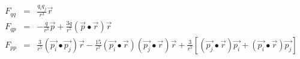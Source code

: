 \documentclass[12pt]{article}
\begin{document}
\begin{eqnarray*}
F_{qq} & = & \frac{q_i q_j}{r^3} \vec{r} \\
F_{qp} & = & -\frac{q}{r^3} \vec{p} + \frac{3q}{r^5} 
             (\vec{p} \bullet \vec{r}) \vec{r} \\
F_{pp} & = & \frac{3}{r^5} (\vec{p_i} \bullet \vec{p_j}) \vec{r} -
             \frac{15}{r^7} (\vec{p_i} \bullet \vec{r}) 
	     (\vec{p_j} \bullet \vec{r}) \vec{r} + 
             \frac{3}{r^5} \left[ (\vec{p_j} \bullet \vec{r}) \vec{p_i} + 
             (\vec{p_i} \bullet \vec{r}) \vec{p_j} \right]
\end{eqnarray*}                                                   
\end{document}
